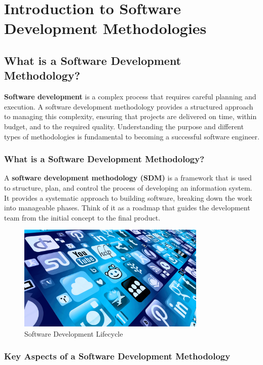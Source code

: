 \chapter{Introduction to Software Development Methodologies}

\section{What is a Software Development Methodology?}

\textbf{Software development} is a complex process that requires careful planning and
execution. A software development methodology provides a structured approach to
managing this complexity, ensuring that projects are delivered on time, within
budget, and to the required quality. Understanding the purpose and different
types of methodologies is fundamental to becoming a successful software
engineer.

\subsection{What is a Software Development Methodology?}

A \textbf{software development methodology (SDM)} is a framework that is used
to structure, plan, and control the process of developing an information
system. It provides a systematic approach to building software, breaking down
the work into manageable phases. Think of it as a roadmap that guides the
development team from the initial concept to the final product.

\begin{figure}[ht]
  \centering
  \includegraphics[width=0.8\textwidth]{images/software_development_lifecycle.png}
  \caption{Software Development Lifecycle}
  \label{fig:software_development_lifecycle}
\end{figure}

\subsection{Key Aspects of a Software Development Methodology}

